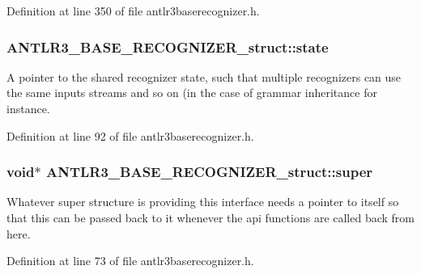 Definition at line 350 of file antlr3baserecognizer.\-h.

\hypertarget{struct_a_n_t_l_r3___b_a_s_e___r_e_c_o_g_n_i_z_e_r__struct_aff56a30644716edb24915f621b6df701}{
\subsubsection[{state}]{ A\-N\-T\-L\-R3\-\_\-\-B\-A\-S\-E\-\_\-\-R\-E\-C\-O\-G\-N\-I\-Z\-E\-R\-\_\-struct\-::state}}\label{struct_a_n_t_l_r3___b_a_s_e___r_e_c_o_g_n_i_z_e_r__struct_aff56a30644716edb24915f621b6df701}
A pointer to the shared recognizer state, such that multiple recognizers can use the same inputs streams and so on (in the case of grammar inheritance for instance. 

Definition at line 92 of file antlr3baserecognizer.\-h.

\hypertarget{struct_a_n_t_l_r3___b_a_s_e___r_e_c_o_g_n_i_z_e_r__struct_a8f0a0953113252a8f7f65e31c945631a}{
\subsubsection[{super}]{\setlength{\rightskip}{0pt plus 5cm}void$\ast$ A\-N\-T\-L\-R3\-\_\-\-B\-A\-S\-E\-\_\-\-R\-E\-C\-O\-G\-N\-I\-Z\-E\-R\-\_\-struct\-::super}}\label{struct_a_n_t_l_r3___b_a_s_e___r_e_c_o_g_n_i_z_e_r__struct_a8f0a0953113252a8f7f65e31c945631a}
Whatever super structure is providing this interface needs a pointer to itself so that this can be passed back to it whenever the api functions are called back from here. 

Definition at line 73 of file antlr3baserecognizer.\-h.

